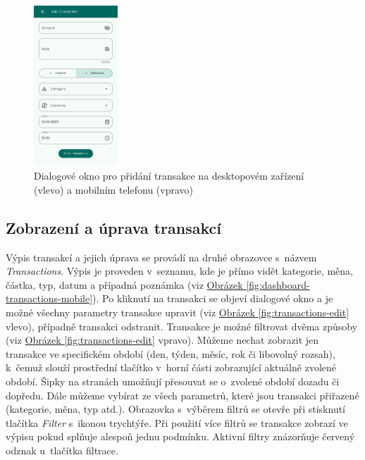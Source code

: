 \documentclass[
  biblatex,
  figures=true,
  tables=false,
  glossaries,
  index
]{kidiplom}
\begin{document}
\begin{figure}
  \centering
  \hspace{0.5em}%
  \includegraphics[width=0.28\textwidth]{images/add-transaction-mobile.png}%
  \caption{Dialogové okno pro přidání transakce na desktopovém zařízení (vlevo) a mobilním telefonu (vpravo)}
  \label{fig:add-transaction}
\end{figure}

\subsection{Zobrazení a úprava transakcí}
Výpis transakcí a jejich úprava se provádí na druhé obrazovce s~názvem \textit{Transactions}. Výpis je proveden v~seznamu, kde je přímo vidět kategorie, měna, částka, typ, datum a případná poznámka (viz \hyperref[fig:dashboard-transactions-mobile]{Obrázek \ref{fig:dashboard-transactions-mobile}}). Po kliknutí na transakci se objeví dialogové okno a je možné všechny parametry transakce upravit (viz \hyperref[fig:transactions-edit]{Obrázek \ref{fig:transactions-edit}} vlevo), případně transakci odstranit. Transakce je možné filtrovat dvěma způsoby (viz \hyperref[fig:transactions-edit]{Obrázek \ref{fig:transactions-edit}} vpravo). Můžeme nechat zobrazit jen transakce ve specifickém období (den, týden, měsíc, rok či libovolný rozsah), k~čemuž slouží prostřední tlačítko v~horní části zobrazující aktuálně zvolené období. Šipky na stranách umožňují přesouvat se o~zvolené období dozadu či dopředu. Dále můžeme vybírat ze všech parametrů, které jsou transakci přiřazené (kategorie, měna, typ atd.). Obrazovka s~výběrem filtrů se otevře při stisknutí tlačítka \textit{Filter} s~ikonou trychtýře. Při použití více filtrů se transakce zobrazí ve výpisu pokud splňuje alespoň jednu podmínku. Aktivní filtry znázorňuje červený odznak u~tlačítka filtrace.
\end{document}
